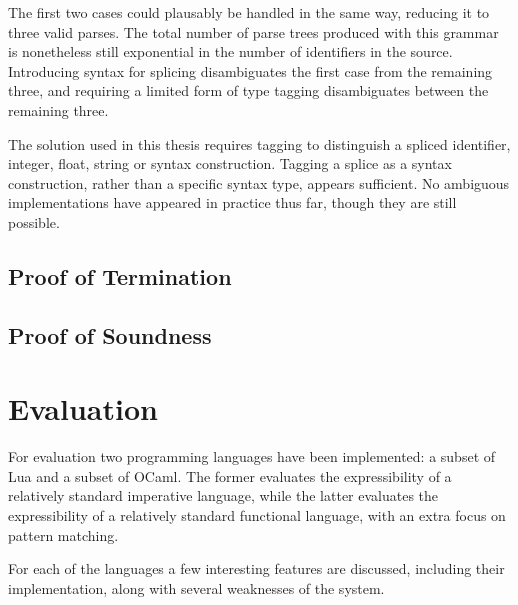 \documentclass{kththesis}
\begin{document}
The first two cases could plausably be handled in the same way, reducing it to three valid parses. The total number of parse trees produced with this grammar is nonetheless still exponential in the number of identifiers in the source. Introducing syntax for splicing disambiguates the first case from the remaining three, and requiring a limited form of type tagging disambiguates between the remaining three.

The solution used in this thesis requires tagging to distinguish a spliced identifier, integer, float, string or syntax construction. Tagging a splice as a syntax construction, rather than a specific syntax type, appears sufficient. No ambiguous implementations have appeared in practice thus far, though they are still possible.

\section{Proof of Termination} \label{sec:proof-termination}

\section{Proof of Soundness} \label{sec:proof-no-errors}

\chapter{Evaluation} \label{sec:evaluation}


For evaluation two programming languages have been implemented: a subset of Lua and a subset of OCaml. The former evaluates the expressibility of a relatively standard imperative language, while the latter evaluates the expressibility of  a relatively standard functional language, with an extra focus on pattern matching.

For each of the languages a few interesting features are discussed, including their implementation, along with several weaknesses of the system.
\end{document}
